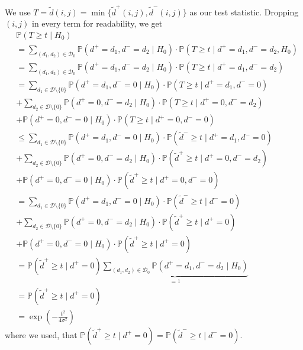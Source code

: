 \documentclass[a4paper,12pt]{article}
\theoremstyle{plain}
\theoremstyle{definition}
\theoremstyle{remark}
\begin{document}
	We use $T = \tilde{d}(i, j) = \min \{ \tilde{d}^+(i, j), \tilde{d}^-(i, j) \}$ as our test statistic. Dropping $(i, j)$ in every term for readability, we get
	\begin{align*}
		&\mathbb{P}(T \geq t \mid H_0) \\
		&= \sum_{(d_1, d_2) \in \mathcal{D}_0} \mathbb{P}(d^+ = d_1, d^- = d_2 \mid H_0) \cdot \mathbb{P}(T \geq t \mid d^+ = d_1, d^- = d_2, H_0) \\
		&= \sum_{(d_1, d_2) \in \mathcal{D}_0} \mathbb{P}(d^+ = d_1, d^- = d_2 \mid H_0) \cdot \mathbb{P}(T \geq t \mid d^+ = d_1, d^- = d_2) \\
		&= \sum_{d_1 \in \mathcal{D} \setminus \{ 0 \}} \mathbb{P}(d^+ = d_1, d^- = 0 \mid H_0) \cdot \mathbb{P}(T \geq t \mid d^+ = d_1, d^- = 0) \\
		&+ \sum_{d_2 \in \mathcal{D} \setminus \{ 0 \}} \mathbb{P}(d^+ = 0, d^- = d_2 \mid H_0) \cdot \mathbb{P}(T \geq t \mid d^+ = 0, d^- = d_2) \\
		&+ \mathbb{P}(d^+ = 0, d^- = 0 \mid H_0) \cdot \mathbb{P}(T \geq t \mid d^+ = 0, d^- = 0) \\
		&\leq \sum_{d_1 \in \mathcal{D} \setminus \{ 0 \}} \mathbb{P}(d^+ = d_1, d^- = 0 \mid H_0) \cdot \mathbb{P}(\tilde{d}^- \geq t \mid d^+ = d_1, d^- = 0) \\
		&+ \sum_{d_2 \in \mathcal{D} \setminus \{ 0 \}} \mathbb{P}(d^+ = 0, d^- = d_2 \mid H_0) \cdot \mathbb{P}(\tilde{d}^+ \geq t \mid d^+ = 0, d^- = d_2) \\
		&+ \mathbb{P}(d^+ = 0, d^- = 0 \mid H_0) \cdot \mathbb{P}(\tilde{d}^+ \geq t \mid d^+ = 0, d^- = 0) \\
		&= \sum_{d_1 \in \mathcal{D} \setminus \{ 0 \}} \mathbb{P}(d^+ = d_1, d^- = 0 \mid H_0) \cdot \mathbb{P}(\tilde{d}^- \geq t \mid d^- = 0) \\
		&+ \sum_{d_2 \in \mathcal{D} \setminus \{ 0 \}} \mathbb{P}(d^+ = 0, d^- = d_2 \mid H_0) \cdot \mathbb{P}(\tilde{d}^+ \geq t \mid d^+ = 0) \\
		&+ \mathbb{P}(d^+ = 0, d^- = 0 \mid H_0) \cdot \mathbb{P}(\tilde{d}^+ \geq t \mid d^+ = 0) \\
		&= \mathbb{P}(\tilde{d}^+ \geq t \mid d^+ = 0) \underbrace{\sum_{(d_1, d_2) \in \mathcal{D}_0} \mathbb{P}(d^+ = d_1, d^- = d_2 \mid H_0)}_{= 1} \\
		&= \mathbb{P}(\tilde{d}^+ \geq t \mid d^+ = 0) \\
		&= \exp \left( - \frac{t^2}{4 \sigma^2} \right)
	\end{align*}
	where we used, that $\mathbb{P}(\tilde{d}^+ \geq t \mid d^+ = 0) = \mathbb{P}(\tilde{d}^- \geq t \mid d^- = 0)$.
	
\end{document}
